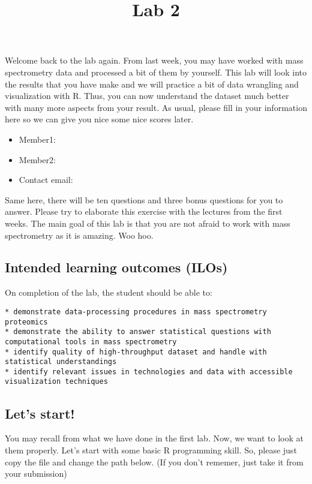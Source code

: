 \documentclass[
  letterpaper,
  DIV=11,
  numbers=noendperiod]{scrartcl}
\title{Lab 2}
\author{}
\date{}
\providecommand{\tightlist}{%
  \setlength{\itemsep}{0pt}\setlength{\parskip}{0pt}}\usepackage{longtable,booktabs,array}
\begin{document}
\maketitle


Welcome back to the lab again. From last week, you may have worked with
mass spectrometry data and processed a bit of them by yourself. This lab
will look into the results that you have make and we will practice a bit
of data wrangling and visualization with R. Thus, you can now understand
the dataset much better with many more aspects from your result. As
usual, please fill in your information here so we can give you nice some
nice scores later.

\begin{itemize}
\tightlist
\item
  Member1:
\item
  Member2:
\item
  Contact email:
\end{itemize}

Same here, there will be ten questions and three bonus questions for you
to answer. Please try to elaborate this exercise with the lectures from
the first weeks. The main goal of this lab is that you are not afraid to
work with mass spectrometry as it is amazing. Woo hoo.

\subsection{Intended learning outcomes
(ILOs)}\label{intended-learning-outcomes-ilos}

On completion of the lab, the student should be able to:

\begin{verbatim}
* demonstrate data-processing procedures in mass spectrometry proteomics
* demonstrate the ability to answer statistical questions with computational tools in mass spectrometry
* identify quality of high-throughput dataset and handle with statistical understandings
* identify relevant issues in technologies and data with accessible visualization techniques
\end{verbatim}

\subsection{Let's start!}\label{lets-start}

You may recall from what we have done in the first lab. Now, we want to
look at them properly. Let's start with some basic R programming skill.
So, please just copy the file and change the path below. (If you don't
rememer, just take it from your submission)
\end{document}

